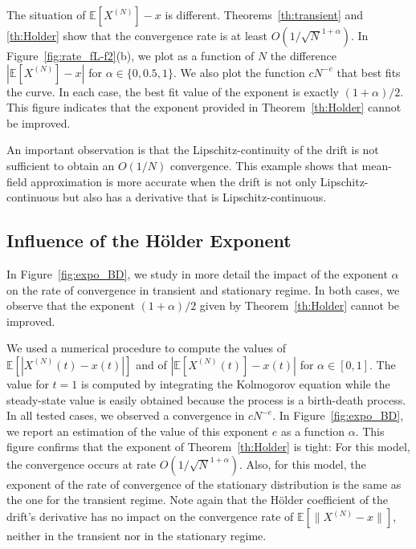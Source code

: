\documentclass[sigconf]{acmart}
\newcommand\XN{X^{(N)}}
\newcommand\sesp[1]{\mathbb{E}[#1]}
\newcommand\snorm[1]{\|#1\|}
\begin{document}
The situation of $\sesp{\XN}-x$ is
different. Theorems~\ref{th:transient} and \ref{th:Holder} show that
the convergence rate is at least $O(1/\sqrt{N}^{1+\alpha})$.  In
Figure~\ref{fig:rate_fL-f2}(b), we plot as a function of $N$ the
difference $|\sesp{\XN}-x|$ for $\alpha\in\{0,0.5,1\}$.  We also plot
the function $cN^{-e}$ that best fits the curve. In each case, the
best fit value of the exponent is exactly $(1+\alpha)/2$.  This figure
indicates that the exponent provided in Theorem~\ref{th:Holder} cannot
be improved.

An important observation is that the Lipschitz-continuity of the drift
is not sufficient to obtain an $O(1/N)$ convergence.  This example
shows that mean-field approximation is more accurate when the drift is
not only Lipschitz-continuous but also has a derivative that is
Lipschitz-continuous. 



\subsection{Influence of the Hölder Exponent}


In Figure~\ref{fig:expo_BD}, we study in more detail the impact of the
exponent $\alpha$ on the rate of convergence in transient and
stationary regime. In both cases, we observe that the exponent
$(1+\alpha)/2$ given by Theorem~\ref{th:Holder} cannot be improved.

We used a numerical procedure to compute the values of
$\sesp{|\XN(t)-x(t)|}$ and of $|\sesp{\XN(t)}-x(t)|$ for
$\alpha\in[0,1]$. The value for $t=1$ is computed by integrating the
Kolmogorov equation while the steady-state value is easily obtained
because the process is a birth-death process. In all tested cases, we
observed a convergence in $cN^{-e}$. In Figure~\ref{fig:expo_BD}, we
report an estimation of the value of this exponent $e$ as a function
$\alpha$.  This figure confirms that the exponent of
Theorem~\ref{th:Holder} is tight: For this model, the convergence
occurs at rate $O(1/\sqrt{N}^{1+\alpha})$.  Also, for this model, the
exponent of the rate of convergence of the stationary distribution is
the same as the one for the transient regime.  Note again that the
Hölder coefficient of the drift's derivative has no impact on the
convergence rate of $\sesp{\snorm{\XN-x}}$, neither in the transient
nor in the stationary regime.
\end{document}
